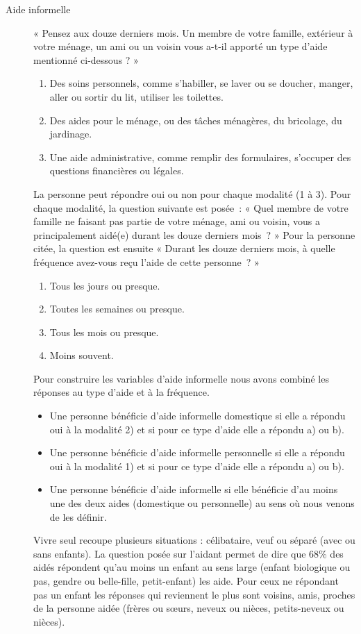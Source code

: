 \begin{Article}
\begin{refsection}[Bonnal]
\begin{appendices}
\begin{description}
\item[Aide informelle] « Pensez aux douze derniers mois. Un membre de votre famille, extérieur à votre ménage, un ami ou un voisin vous a-t-il apporté un type d’aide mentionné ci-dessous ? »
\begin{enumerate}
\item Des soins personnels, comme s'habiller, se laver ou se doucher, manger, aller ou sortir du lit, utiliser les toilettes.
\item Des aides pour le ménage, ou des tâches ménagères, du bricolage, du jardinage.
\item Une aide administrative, comme remplir des formulaires, s'occuper des questions financières ou légales.
\end{enumerate}

La personne peut répondre oui ou non pour chaque modalité (1 à 3). Pour chaque modalité, la question suivante est posée~: « Quel membre de votre famille ne faisant pas partie de votre ménage, ami ou voisin, vous a principalement aidé(e) durant les douze derniers mois~? » 
Pour la personne citée, la question est ensuite « Durant les douze derniers mois, à quelle fréquence avez-vous reçu l’aide de cette personne~? »
\begin{enumerate}
\item Tous les jours ou presque.
\item Toutes les semaines ou presque.
\item Tous les mois ou presque.
\item Moins souvent.
\end{enumerate}

Pour construire les variables d’aide informelle nous avons combiné les réponses au type d’aide et à la fréquence.
\begin{itemize}
\item Une personne bénéficie d’aide informelle domestique si elle a répondu oui à la modalité 2) et si pour ce type d’aide elle a répondu a) ou b).
\item Une personne bénéficie d’aide informelle personnelle si elle a répondu oui à la modalité 1) et si pour ce type d’aide elle a répondu a) ou b).
\item Une personne bénéficie d’aide informelle si elle bénéficie d’au moins une des deux aides (domestique ou personnelle) au sens où nous venons de les définir.
\end{itemize}

Vivre seul recoupe plusieurs situations : célibataire, veuf ou séparé (avec ou sans enfants). La question posée sur l’aidant permet de dire que 68\% des aidés répondent qu’au moins un enfant au sens large (enfant biologique ou pas, gendre ou belle-fille, petit-enfant) les aide. Pour ceux ne répondant pas un enfant les réponses qui reviennent le plus sont voisins, amis, proches de la personne aidée (frères ou sœurs, neveux ou nièces, petits-neveux ou nièces).
\end{description}


\end{appendices}
\end{refsection}
\end{Article}
